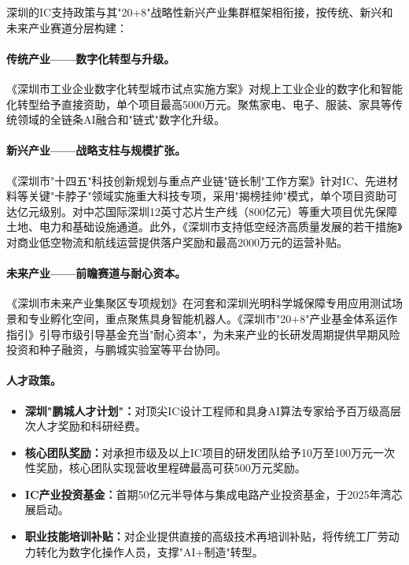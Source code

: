 \documentclass[12pt,a4paper]{article}
\begin{document}
深圳的IC支持政策与其"20+8"战略性新兴产业集群框架相衔接，按传统、新兴和未来产业赛道分层构建：

\paragraph{传统产业——数字化转型与升级。}
《深圳市工业企业数字化转型城市试点实施方案》对规上工业企业的数字化和智能化转型给予直接资助，单个项目最高5000万元。聚焦家电、电子、服装、家具等传统领域的全链条AI融合和"链式"数字化升级。

\paragraph{新兴产业——战略支柱与规模扩张。}
《深圳市"十四五"科技创新规划与重点产业链"链长制"工作方案》针对IC、先进材料等关键"卡脖子"领域实施重大科技专项，采用"揭榜挂帅"模式，单个项目资助可达亿元级别。对中芯国际深圳12英寸芯片生产线（800亿元）等重大项目优先保障土地、电力和基础设施通道。此外，《深圳市支持低空经济高质量发展的若干措施》对商业低空物流和航线运营提供落户奖励和最高2000万元的运营补贴。

\paragraph{未来产业——前瞻赛道与耐心资本。}
《深圳市未来产业集聚区专项规划》在河套和深圳光明科学城保障专用应用测试场景和专业孵化空间，重点聚焦具身智能机器人。《深圳市"20+8"产业基金体系运作指引》引导市级引导基金充当"耐心资本"，为未来产业的长研发周期提供早期风险投资和种子融资，与鹏城实验室等平台协同。

\paragraph{人才政策。}
\begin{itemize}
    \item \textbf{深圳"鹏城人才计划"：}对顶尖IC设计工程师和具身AI算法专家给予百万级高层次人才奖励和科研经费。
    \item \textbf{核心团队奖励：}对承担市级及以上IC项目的研发团队给予10万至100万元一次性奖励，核心团队实现营收里程碑最高可获500万元奖励。
    \item \textbf{IC产业投资基金：}首期50亿元半导体与集成电路产业投资基金，于2025年湾芯展启动。
    \item \textbf{职业技能培训补贴：}对企业提供直接的高级技术再培训补贴，将传统工厂劳动力转化为数字化操作人员，支撑"AI+制造"转型。
\end{itemize}
\end{document}
